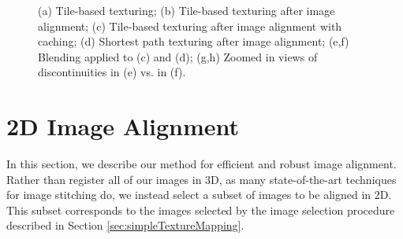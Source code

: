 \documentclass[]{spie}  %
\begin{document}
\begin{figure}
  \centering {}

  \caption{(a) Tile-based texturing; (b) Tile-based texturing after
    image alignment; (c) Tile-based texturing after image alignment
    with caching; (d) Shortest path texturing after image alignment;
    (e,f) Blending applied to (c) and (d); (g,h) Zoomed in views of
    discontinuities in (e) vs. in (f).}
  \label{fig:compareAll}
\end{figure}


\section{2D Image Alignment}
\label{sec:2dAlignment}
In this section, we describe our method for efficient and robust image
alignment. Rather than register all of our images in 3D, as many
state-of-the-art techniques for image stitching do, we instead select
a subset of images to be aligned in 2D. This subset corresponds to the
images selected by the image selection procedure described in Section
\ref{sec:simpleTextureMapping}.
\end{document}
